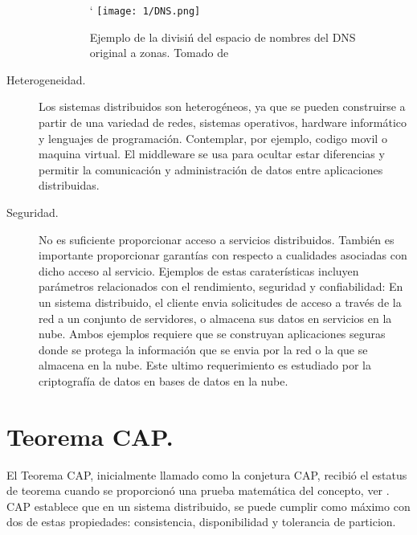 \begin{description}
\begin{itemize}
			\begin{figure}%
				`			\texttt{[image: 1/DNS.png]}
				\caption{Ejemplo de la divisi\'n del espacio de nombres del DNS original a zonas. Tomado de \ST}
				\label{fig:DNSorg}
			\end{figure}			
 			
		\end{itemize}
		
		\item[{Heterogeneidad}.]  
		Los sistemas distribuidos son heterogéneos, ya que se pueden construirse a partir de una variedad de redes, sistemas operativos, hardware informático y lenguajes de programación. Contemplar, por ejemplo, \gls{codigo movil} o \gls{maquina virtual}. El \gls{middleware} se usa para ocultar estar diferencias y permitir la comunicación y administración de datos entre aplicaciones distribuidas.
			
		
		\item[{Seguridad.}]  
		  
		No es suficiente proporcionar acceso a servicios distribuidos. También es importante proporcionar garantías con respecto a cualidades asociadas con dicho acceso al servicio.  Ejemplos de estas caraterísticas incluyen parámetros relacionados con el rendimiento, seguridad y confiabilidad:  En un sistema distribuido, el cliente envia solicitudes de acceso a través de la red a un conjunto de servidores, o almacena sus datos en servicios en la nube. Ambos ejemplos requiere que se construyan aplicaciones seguras donde se protega la información que se envia por la red o la que se almacena en la nube. Este ultimo requerimiento es estudiado por la  criptografía de datos en  bases de datos en la nube.
		
	\end{description}

\section{Teorema CAP.}	 El \gls{Teorema CAP}, inicialmente llamado como la conjetura CAP, recibi\'o el estatus de teorema cuando se proporcion\'o una prueba matem\'atica del concepto, ver . 
 CAP establece que en un sistema distribuido, se puede cumplir como m\'aximo con dos de estas propiedades: \gls{consistencia}, \gls{disponibilidad} y \gls{tolerancia de particion}. 

